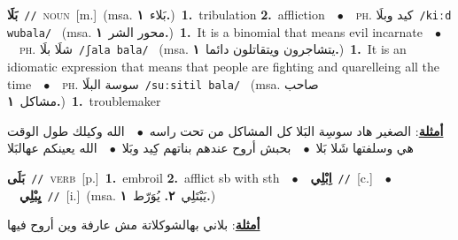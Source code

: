 \documentclass[10pt,a4paper,twoside]{article} %
\begin{document}
\begin{multicols}{2}
{\setlength\topsep{0pt}\textbf{\foreignlanguage{arabic}{بَلَا}}\ {\color{gray}\texttt{//}\color{black}}\ \textsc{noun}\ [m.]\ \color{gray}(msa. \foreignlanguage{arabic}{بَلاء}~\foreignlanguage{arabic}{\textbf{١.}})\color{black}\ \textbf{1.}~tribulation  \textbf{2.}~affliction\ \ $\bullet$\ \ \textsc{ph.} \color{gray} \foreignlanguage{arabic}{كيد وبلَا}\color{black}\ {\color{gray}\texttt{/{\sffamily kiːd wubala}/}\color{black}}\ \color{gray} (msa. \foreignlanguage{arabic}{محور الشر}~\foreignlanguage{arabic}{\textbf{١.}})\color{black}\ \textbf{1.}~It is a binomial that means evil incarnate\ \ $\bullet$\ \ \textsc{ph.} \color{gray} \foreignlanguage{arabic}{شلَا بلَا}\color{black}\ {\color{gray}\texttt{/{\sffamily ʃala bala}/}\color{black}}\ \color{gray} (msa. \foreignlanguage{arabic}{يتشاجرون ويتقاتلون دائما}~\foreignlanguage{arabic}{\textbf{١.}})\color{black}\ \textbf{1.}~It is an idiomatic expression that means that people are fighting and quarelleing all the time\ \ $\bullet$\ \ \textsc{ph.} \color{gray} \foreignlanguage{arabic}{سوسة البلَا}\color{black}\ {\color{gray}\texttt{/{\sffamily suːsitil bala}/}\color{black}}\ \color{gray} (msa. \foreignlanguage{arabic}{صاحب مشاكل}~\foreignlanguage{arabic}{\textbf{١.}})\color{black}\ \textbf{1.}~troublemaker\  \begin{flushright}\color{gray}\foreignlanguage{arabic}{\textbf{\underline{\foreignlanguage{arabic}{أمثلة}}}: الصغير هاد سوسِة البَلا كل المشاكل من تحت راسه\ $\bullet$\ \  الله وكيلك طول الوقت هي وسلفتها شَلا بَلا\ $\bullet$\ \  بحبش أروح عندهم بناتهم كِيد وبَلا\ $\bullet$\ \  الله يعينكم عهالبَلا}\end{flushright}\color{black}} \vspace{2mm}

{\setlength\topsep{0pt}\textbf{\foreignlanguage{arabic}{بَلَى}}\ {\color{gray}\texttt{//}\color{black}}\ \textsc{verb}\ [p.]\ \textbf{1.}~embroil  \textbf{2.}~afflict sb with sth\ \ $\bullet$\ \ \setlength\topsep{0pt}\textbf{\foreignlanguage{arabic}{اِبْلِي}}\ {\color{gray}\texttt{//}\color{black}}\ [c.]\ \ $\bullet$\ \ \setlength\topsep{0pt}\textbf{\foreignlanguage{arabic}{يِبْلِي}}\ {\color{gray}\texttt{//}\color{black}}\ [i.]\ \color{gray}(msa. \foreignlanguage{arabic}{يَبْتَلِي}~\foreignlanguage{arabic}{\textbf{٢.}}  \foreignlanguage{arabic}{يُوَرّط}~\foreignlanguage{arabic}{\textbf{١.}})\color{black}\  \begin{flushright}\color{gray}\foreignlanguage{arabic}{\textbf{\underline{\foreignlanguage{arabic}{أمثلة}}}: بلاني بهالشوكلاتة مش عارفة وين أروح فيها}\end{flushright}\color{black}} \vspace{2mm}


\end{multicols}
\end{document}
